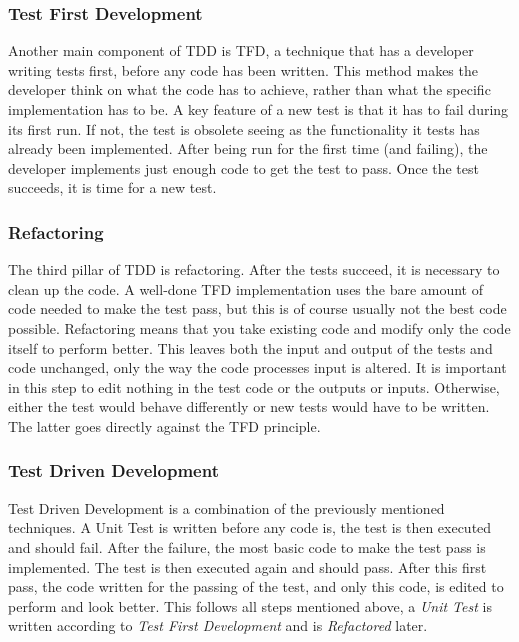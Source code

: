 \documentclass[11pt,british]{article}
\begin{document}
\subsubsection{Test First Development}
Another main component of \gls{TDD} is \gls{TFD}, a technique that has a developer writing tests first, before any code has been written. This method makes the developer think on what the code has to achieve, rather than what the specific implementation has to be. A key feature of a new test is that it has to fail during its first run. If not, the test is obsolete seeing as the functionality it tests has already been implemented. After being run for the first time (and failing), the developer implements just enough code to get the test to pass. Once the test succeeds, it is time for a new test.

\subsubsection{Refactoring}
The third pillar of TDD is refactoring. After the tests succeed, it is necessary to clean up the code. A well-done \gls{TFD} implementation uses the bare amount of code needed to make the test pass, but this is of course usually not the best code possible. Refactoring means that you take existing code and modify only the code itself to perform better. This leaves both the input and output of the tests and code unchanged, only the way the code processes input is altered. It is important in this step to edit nothing in the test code or the outputs or inputs. Otherwise, either the test would behave differently or new tests would have to be written. The latter goes directly against the \gls{TFD} principle.

\subsubsection{Test Driven Development}
Test Driven Development is a combination of the previously mentioned techniques. A Unit Test is written before any code is, the test is then executed and should fail. After the failure, the most basic code to make the test pass is implemented. The test is then executed again and should pass. After this first pass, the code written for the passing of the test, and only this code, is edited to perform and look better. This follows all steps mentioned above, a \emph{Unit Test} is written according to \emph{Test First Development} and is \emph{Refactored} later.
\end{document}
